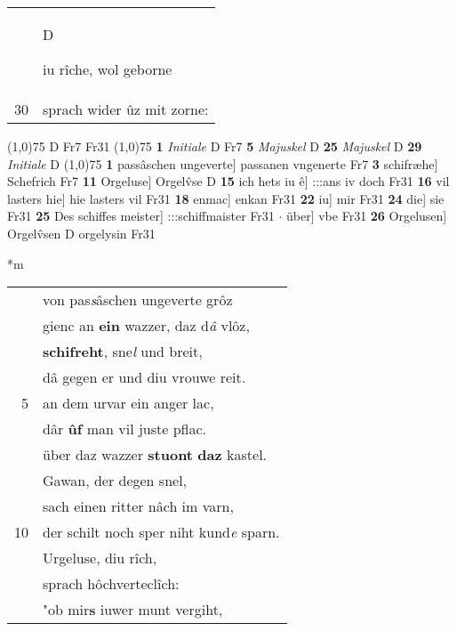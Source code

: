 \documentclass[8pt,a4paper,notitlepage]{article}
\begin{document}
\begin{table}[ht]
\begin{minipage}[t]{0.5\linewidth}
\begin{tabular}{rl}
 & \begin{large}D\end{large}iu rîche, wol geborne\\ 
30 & sprach wider ûz mit zorne:\\ 
\end{tabular}
\scriptsize
\line(1,0){75} \newline
D Fr7 Fr31 \newline
\line(1,0){75} \newline
\textbf{1} \textit{Initiale} D Fr7  \textbf{5} \textit{Majuskel} D  \textbf{25} \textit{Majuskel} D  \textbf{29} \textit{Initiale} D  \newline
\line(1,0){75} \newline
\textbf{1} passâschen ungeverte] passanen vngenerte Fr7 \textbf{3} schifræhe] Schefrich Fr7 \textbf{11} Orgeluse] Orgelv̂se D \textbf{15} ich hets iu ê] :::ans iv doch Fr31 \textbf{16} vil lasters hie] hie lasters vil Fr31 \textbf{18} enmac] enkan Fr31 \textbf{22} iu] mir Fr31 \textbf{24} die] sie Fr31 \textbf{25} Des schiffes meister] :::schiffmaister Fr31  $\cdot$ über] vbe Fr31 \textbf{26} Orgelusen] Orgelv̂sen D orgelysin Fr31 \newline
\end{minipage}
\hspace{0.5cm}
\begin{minipage}[t]{0.5\linewidth}
\small
\begin{center}*m
\end{center}
\begin{tabular}{rl}
 & von pas\textit{s}âschen ungeverte grôz\\ 
 & gienc an \textbf{ein} wazzer, daz d\textit{â} vlôz,\\ 
 & \textbf{schifreht}, sne\textit{l} und breit,\\ 
 & dâ gegen er und diu vrouwe reit.\\ 
5 & an dem urvar ein anger lac,\\ 
 & dâr \textbf{ûf} man vil juste pflac.\\ 
 & über daz wazzer \textbf{stuont} \textbf{daz} kastel.\\ 
 & Gawan, der degen snel,\\ 
 & sach einen ritter nâch im varn,\\ 
10 & der schilt noch sper niht kund\textit{e} sparn.\\ 
 & Urgeluse, diu rîch,\\ 
 & sprach hôchverteclîch:\\ 
 & "ob mir\textbf{s} iuwer munt vergiht,\\ 

\end{tabular}
\end{minipage}
\end{table}
\end{document}
